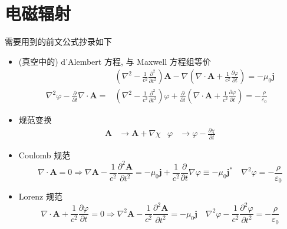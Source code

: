 \documentclass[12pt,a4paper]{article}%
\numberwithin{equation}{section}%
\renewcommand*{\vec}[1]{\bm{#1}}%
\begin{document}
\section{电磁辐射} %
\label{sec:radiation}
需要用到的前文公式抄录如下
\begin{itemize}
    \item (真空中的) d'Alembert 方程, 与 Maxwell 方程组等价
    \begin{align}\label{equ:dalembert}
        &\left(\nabla^2- \frac 1{c^2}\frac{\partial^2}{\partial t^2}\right)\vec A - \nabla\left(\nabla\cdot\vec A + \frac 1{c^2}\frac{\partial \varphi}{\partial t}\right) = -\mu_0\vec j \\
        \nabla^2\varphi - \frac{\partial}{\partial t}\nabla\cdot\vec A = 
        &\left(\nabla^2- \frac 1{c^2}\frac{\partial^2}{\partial t^2}\right)\varphi + \frac{\partial}{\partial t}\left(\nabla\cdot\vec A + \frac 1{c^2}\frac{\partial \varphi}{\partial t}\right) = -\frac{\rho}{\varepsilon_0}
    \end{align}
    \item 规范变换
    \begin{align}\label{equ:gauge_trans}
     \vec A &\rightarrow \vec A + \nabla\chi 
     &\varphi &\rightarrow \varphi - \frac{\partial\chi}{\partial t}
    \end{align}
    \item Coulomb 规范
    \begin{equation}
        \nabla\cdot\vec A = 0\Longrightarrow 
        \nabla\vec A - \frac 1{c^2}\frac{\partial^2\vec A}{\partial t^2} = -\mu_0\vec j + \frac 1{c^2}\frac{\partial}{\partial t}\nabla\varphi \equiv -\mu_0\vec j^* \quad
        \nabla^2\varphi = -\frac{\rho}{\varepsilon_0}
    \end{equation}
    \item Lorenz 规范
    \begin{equation}\label{equ:lorenz_gauge}
        \nabla\cdot\vec A + \frac 1{c^2}\frac{\partial \varphi}{\partial t} = 0\Longrightarrow
        \nabla^2\vec A - \frac 1{c^2}\frac{\partial^2\vec A}{\partial t^2} = -\mu_0\vec j \quad
        \nabla^2\varphi - \frac 1{c^2}\frac{\partial^2\varphi}{\partial t^2} = -\frac{\rho}{\varepsilon_0}
    \end{equation}
\end{itemize}
\end{document}
